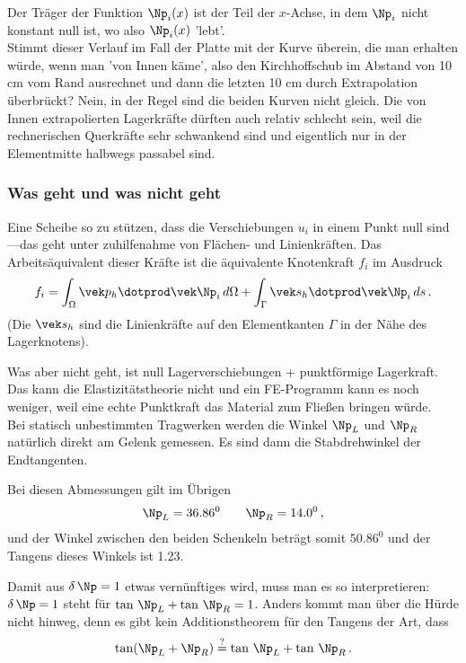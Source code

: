 {Der Tr\"{a}ger der Funktion $\Np_i(x)$ ist der Teil der $x$-Achse, in dem $\Np_i$ nicht konstant null ist, wo also $\Np_i(x)$ 'lebt'.
\\

Stimmt dieser Verlauf im Fall der Platte mit der Kurve \"{u}berein, die man erhalten w\"{u}rde, wenn man 'von Innen k\"{a}me', also den Kirchhoffschub im Abstand von 10 cm vom Rand ausrechnet und dann die letzten 10 cm durch Extrapolation \"{u}berbr\"{u}ckt? Nein, in der Regel sind die beiden Kurven nicht gleich. Die von Innen extrapolierten Lagerkr\"{a}fte d\"{u}rften auch relativ schlecht sein, weil die rechnerischen Querkr\"{a}fte sehr schwankend sind und eigentlich nur in der Elementmitte halbwegs passabel sind.
\\

\subsubsection*{Was geht und was nicht geht}

Eine Scheibe so zu st\"{u}tzen, dass die Verschiebungen $u_i$ in einem Punkt null sind---das geht unter zuhilfenahme von Fl\"{a}chen- und Linienkr\"{a}ften.
Das Arbeits\"{a}quivalent dieser Kr\"{a}fte ist die \"{a}quivalente Knotenkraft $f_i$ im Ausdruck
\begin{align}
f_i = \int_{\Omega} \vek p_h \dotprod \vek \Np_i\,d\Omega + \int_{\Gamma} \vek  s_h\dotprod \vek \Np_i\,ds\,.
\end{align}
(Die $\vek s_h$ sind die Linienkr\"{a}fte auf den Elementkanten $\Gamma$ in der N\"{a}he des Lagerknotens).

Was aber nicht geht, ist null Lagerverschiebungen + punktf\"{o}rmige Lagerkraft. Das kann die Elastizit\"{a}tstheorie nicht und ein FE-Programm kann es noch weniger, weil eine echte Punktkraft das Material zum Flie{\ss}en bringen w\"{u}rde.\\

Bei statisch unbestimmten Tragwerken werden die Winkel $\Np_L$ und $\Np_R$ nat\"{u}rlich direkt am Gelenk gemessen. Es sind dann die Stabdrehwinkel der Endtangenten.

Bei diesen Abmessungen gilt im \"{U}brigen
\begin{align}
\Np_L = 36.86^0 \qquad \Np_R = 14.0^0\,,
\end{align}
und der Winkel zwischen den beiden Schenkeln betr\"{a}gt somit $50.86^0$ und der Tangens dieses Winkels ist 1.23.

Damit aus $\delta\,\Np = 1$ etwas vern\"{u}nftiges wird, muss man es so interpretieren:  $\delta\,\Np = 1$ steht f\"{u}r $\tan\,\Np_L + \tan\,\Np_R = 1$. Anders kommt man \"{u}ber die H\"{u}rde nicht hinweg, denn es gibt kein Additionstheorem f\"{u}r den Tangens der Art, dass
\begin{align}
\tan(\Np_L + \Np_R) \overset{?}{=} \tan\,\Np_L + \tan\,\Np_R\,.
\end{align}


}
